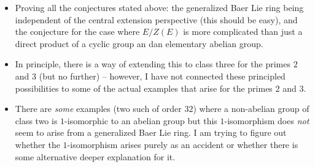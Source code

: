 \documentclass[10pt]{amsart}
\begin{document}
\begin{itemize}
\item Proving all the conjectures stated above: the generalized Baer
  Lie ring being independent of the central extension perspective
  (this should be easy), and the conjecture for the case where
  $E/Z(E)$ is more complicated than just a direct product of a cyclic
  group an dan elementary abelian group.
\item In principle, there is a way of extending this to class three
  for the primes $2$ and $3$ (but no further) -- however, I have not
  connected these principled possibilities to some of the actual
  examples that arise for the primes $2$ and $3$.
\item There are {\em some} examples (two such of order $32$) where a
  non-abelian group of class two is $1$-isomorphic to an abelian group
  but this $1$-isomorphism does {\em not} seem to arise from a
  generalized Baer Lie ring. I am trying to figure out whether the
  $1$-isomorphism arises purely as an accident or whether there is
  some alternative deeper explanation for it.
\end{itemize}
\end{document}
